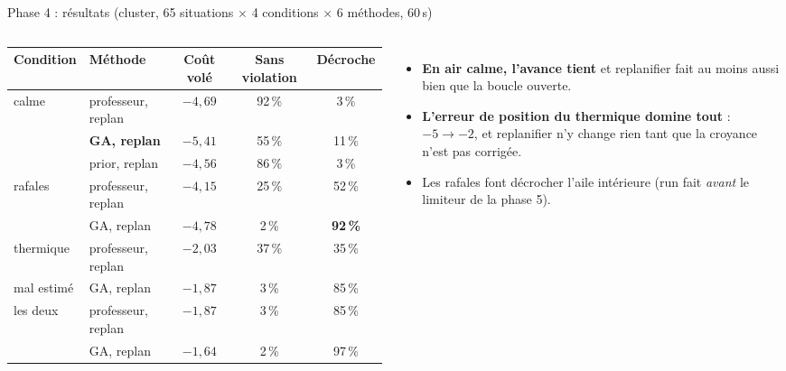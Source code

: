 \documentclass[aspectratio=169,10pt]{beamer}
\newcommand{\good}[1]{\textcolor{climb}{\textbf{#1}}}
\newcommand{\bad}[1]{\textcolor{sink}{\textbf{#1}}}
\begin{document}
\begin{frame}{Phase 4 : résultats (cluster, 65 situations $\times$ 4 conditions $\times$ 6 méthodes, 60\,s)}
  \begin{columns}[T]
    \scriptsize
    \begin{tabular}{@{}llccc@{}}
      \toprule
      Condition & Méthode & Coût volé & Sans violation & Décroche \\ \midrule
      calme & professeur, replan & $-4{,}69$ & 92\,\% & 3\,\% \\
            & \textbf{GA, replan} & \good{$-5{,}41$} & 55\,\% & 11\,\% \\
            & prior, replan & $-4{,}56$ & 86\,\% & 3\,\% \\ \midrule
      rafales & professeur, replan & $-4{,}15$ & 25\,\% & 52\,\% \\
              & GA, replan & $-4{,}78$ & 2\,\% & \bad{92\,\%} \\ \midrule
      thermique & professeur, replan & \bad{$-2{,}03$} & 37\,\% & 35\,\% \\
      mal estimé & GA, replan & \bad{$-1{,}87$} & 3\,\% & 85\,\% \\ \midrule
      les deux & professeur, replan & $-1{,}87$ & 3\,\% & 85\,\% \\
               & GA, replan & $-1{,}64$ & 2\,\% & 97\,\% \\
      \bottomrule
    \end{tabular}
    \small
    \begin{itemize}
      \item \good{En air calme, l'avance tient} et replanifier fait au moins aussi bien que la boucle ouverte.
      \item \bad{L'erreur de position du thermique domine tout} : $-5 \to -2$, et replanifier n'y change rien tant que la croyance n'est pas corrigée.
      \item Les rafales font décrocher l'aile intérieure (run fait \emph{avant} le limiteur de la phase 5).
    \end{itemize}
  \end{columns}
\end{frame}
\end{document}
